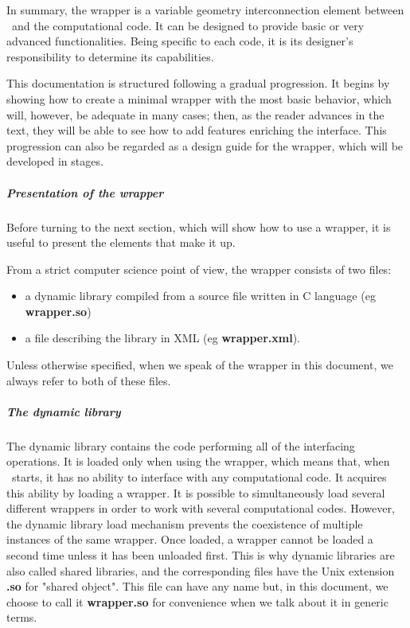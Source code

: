 In summary, the wrapper is a variable geometry interconnection element between \OT\ and the computational code. It can be designed to provide basic or very advanced functionalities. Being specific to each code, it is its designer's responsibility to determine its capabilities.

This documentation is structured following a gradual progression. It begins by showing how to create a minimal wrapper with the most basic behavior, which will, however, be adequate in many cases; then, as the reader advances in the text, they will be able to see how to add features enriching the interface. This progression can also be regarded as a design guide for the wrapper, which will be developed in stages.

\subparagraph{Presentation of the wrapper}

Before turning to the next section, which will show how to use a wrapper, it is useful to present the elements that make it up.

From a strict computer science point of view, the wrapper consists of two files:
\begin{itemize}
\item a dynamic library compiled from a source file written in C language (eg {\bf {}wrapper.so})
\item a file describing the library in XML (eg {\bf {}wrapper.xml}).
\end{itemize}

Unless otherwise specified, when we speak of the wrapper in this document, we always refer to both of these files.

\subparagraph{The dynamic library}

The dynamic library contains the code performing all of the interfacing operations. It is loaded only when using the wrapper, which means that, when \OT\ starts, it has no ability to interface with any computational code. It acquires this ability by loading a wrapper. It is possible to simultaneously load several different wrappers in order to work with several computational codes. However, the dynamic library load mechanism prevents the coexistence of multiple instances of the same wrapper. Once loaded, a wrapper cannot be loaded a second time unless it has been unloaded first. This is why dynamic libraries are also called shared libraries, and the corresponding files have the Unix extension {\bf .so} for "shared object". This file can have any name but, in this document, we choose to call it {\bf wrapper.so} for convenience when we talk about it in generic terms.

